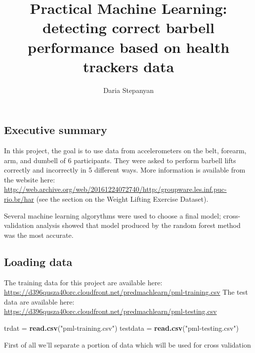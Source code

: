 \documentclass[]{article}
\title{Practical Machine Learning: detecting correct barbell performance based
on health trackers data}
\author{Daria Stepanyan}
\date{}
\newenvironment{Shaded}{\begin{snugshade}}{\end{snugshade}}
\newcommand{\KeywordTok}[1]{\textcolor[rgb]{0.13,0.29,0.53}{\textbf{#1}}}
\newcommand{\DataTypeTok}[1]{\textcolor[rgb]{0.13,0.29,0.53}{#1}}
\newcommand{\DecValTok}[1]{\textcolor[rgb]{0.00,0.00,0.81}{#1}}
\newcommand{\StringTok}[1]{\textcolor[rgb]{0.31,0.60,0.02}{#1}}
\newcommand{\OperatorTok}[1]{\textcolor[rgb]{0.81,0.36,0.00}{\textbf{#1}}}
\newcommand{\NormalTok}[1]{#1}
\begin{document}
\maketitle

\subsection{Executive summary}\label{executive-summary}

In this project, the goal is to use data from accelerometers on the
belt, forearm, arm, and dumbell of 6 participants. They were asked to
perform barbell lifts correctly and incorrectly in 5 different ways.
More information is available from the website here:
\url{http://web.archive.org/web/20161224072740/http:/groupware.les.inf.puc-rio.br/har}
(see the section on the Weight Lifting Exercise Dataset).

Several machine learning algorythms were used to choose a final model;
cross-validation analysis showed that model produced by the random
forest method was the most accurate.

\subsection{Loading data}\label{loading-data}

The training data for this project are available here:
\url{https://d396qusza40orc.cloudfront.net/predmachlearn/pml-training.csv}
The test data are available here:
\url{https://d396qusza40orc.cloudfront.net/predmachlearn/pml-testing.csv}

\begin{Shaded}
\begin{Highlighting}[]
\NormalTok{trdat =}\StringTok{ }\KeywordTok{read.csv}\NormalTok{(}\StringTok{"pml-training.csv"}\NormalTok{)}
\NormalTok{testdata =}\StringTok{ }\KeywordTok{read.csv}\NormalTok{(}\StringTok{"pml-testing.csv"}\NormalTok{)}
\end{Highlighting}
\end{Shaded}

First of all we'll separate a portion of data which will be used for
cross validation

\begin{Shaded}
\end{Shaded}
\end{document}
